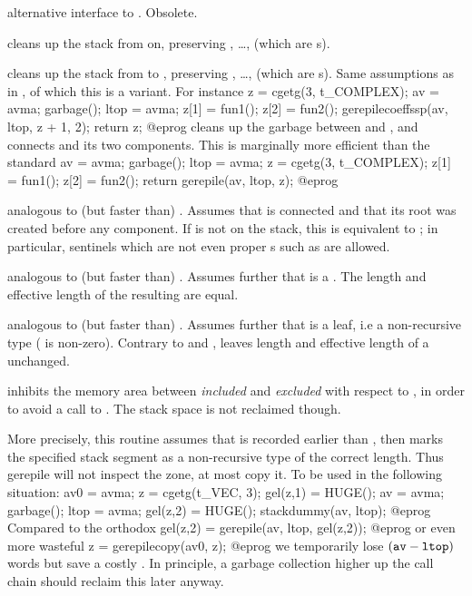 alternative interface to . Obsolete.

 cleans up the stack
from  on, preserving , \dots,  (which are
s).

cleans up the stack from  to , preserving ,
\dots,  (which are s). Same assumptions as in
, of which this is a variant. For instance
\bprog
  z = cgetg(3, t_COMPLEX);
  av = avma; garbage(); ltop = avma;
  z[1] = fun1();
  z[2] = fun2();
  gerepilecoeffssp(av, ltop, z + 1, 2);
  return z;
@eprog\noindent
cleans up the garbage between  and , and connects 
and its two components. This is marginally more efficient than the standard
\bprog
  av = avma; garbage(); ltop = avma;
  z = cgetg(3, t_COMPLEX);
  z[1] = fun1();
  z[2] = fun2(); return gerepile(av, ltop, z);
@eprog\noindent

 analogous to (but faster than)
. Assumes that  is connected and that its root was
created before any component. If  is not on the stack, this is
equivalent to ; in particular, sentinels which are not even
proper s such as  are allowed.

 analogous to (but faster than)
. Assumes further that  is a . The
length and effective length of the resulting  are equal.

 analogous to (but faster than)
. Assumes further that  is a leaf, i.e a
non-recursive type ( is non-zero). Contrary to
 and ,  leaves
length and effective length of a  unchanged.


 inhibits the memory area
between  \emph{included} and  \emph{excluded} with respect to
, in order to avoid a call to .
The stack space is not reclaimed though.

More precisely, this routine assumes that  is recorded earlier
than , then marks the specified stack segment as a
non-recursive type of the correct length. Thus gerepile will not inspect
the zone, at most copy it. To be used in the following situation:
\bprog
  av0 = avma; z = cgetg(t_VEC, 3);
  gel(z,1) = HUGE(); av = avma; garbage(); ltop = avma;
  gel(z,2) = HUGE(); stackdummy(av, ltop);
@eprog\noindent
Compared to the orthodox
\bprog
  gel(z,2) = gerepile(av, ltop, gel(z,2));
@eprog\noindent
or even more wasteful
\bprog
  z = gerepilecopy(av0, z);
@eprog\noindent
we temporarily lose $({\tt av} - {\tt ltop})$ words but save a costly
. In principle, a garbage collection higher up the call
chain should reclaim this later anyway.

